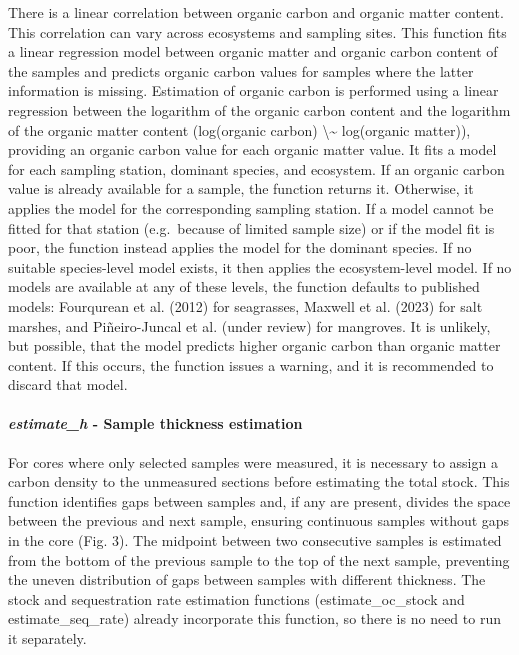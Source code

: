 \documentclass[10pt,a4paper,onecolumn]{article}
\let\oldparagraph\paragraph
\renewcommand{\paragraph}[1]{\oldparagraph{#1}\mbox{}}
\begin{document}
There is a linear correlation between organic carbon and organic matter
content. This correlation can vary across ecosystems and sampling sites.
This function fits a linear regression model between organic matter and
organic carbon content of the samples and predicts organic carbon values
for samples where the latter information is missing. Estimation of
organic carbon is performed using a linear regression between the
logarithm of the organic carbon content and the logarithm of the organic
matter content (log(organic carbon) \textbackslash\textasciitilde{}
log(organic matter)), providing an organic carbon value for each organic
matter value. It fits a model for each sampling station, dominant
species, and ecosystem. If an organic carbon value is already available
for a sample, the function returns it. Otherwise, it applies the model
for the corresponding sampling station. If a model cannot be fitted for
that station (e.g.~because of limited sample size) or if the model fit
is poor, the function instead applies the model for the dominant
species. If no suitable species-level model exists, it then applies the
ecosystem-level model. If no models are available at any of these
levels, the function defaults to published models: Fourqurean et al.
(2012) for seagrasses, Maxwell et al. (2023) for salt marshes, and
Piñeiro-Juncal et al. (under review) for mangroves. It is unlikely, but
possible, that the model predicts higher organic carbon than organic
matter content. If this occurs, the function issues a warning, and it is
recommended to discard that model.

\paragraph{\texorpdfstring{\textbf{\emph{estimate\_h}} \textbf{- Sample
thickness
estimation}}{estimate\_h - Sample thickness estimation}}\label{estimate_h---sample-thickness-estimation}

For cores where only selected samples were measured, it is necessary to
assign a carbon density to the unmeasured sections before estimating the
total stock. This function identifies gaps between samples and, if any
are present, divides the space between the previous and next sample,
ensuring continuous samples without gaps in the core (Fig. 3). The
midpoint between two consecutive samples is estimated from the bottom of
the previous sample to the top of the next sample, preventing the uneven
distribution of gaps between samples with different thickness. The stock
and sequestration rate estimation functions (estimate\_oc\_stock and
estimate\_seq\_rate) already incorporate this function, so there is no
need to run it separately.
\end{document}

